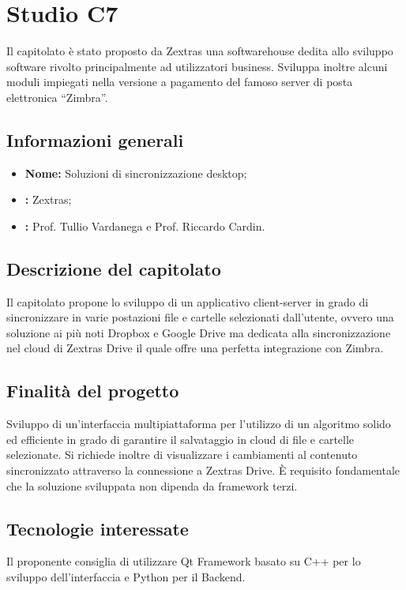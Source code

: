 \section{Studio C7}

Il capitolato è stato proposto da Zextras una softwarehouse dedita allo sviluppo software rivolto principalmente ad utilizzatori business.
Sviluppa inoltre alcuni moduli impiegati nella versione a pagamento del famoso server di posta elettronica “Zimbra”.

\subsection{Informazioni generali}
\begin{itemize}
	\item \textbf{Nome:} Soluzioni di sincronizzazione desktop;
	\item \textbf{:} Zextras;
	\item \textbf{:} Prof. Tullio Vardanega e Prof. Riccardo Cardin.
\end{itemize}

\subsection{Descrizione del capitolato}
Il capitolato propone lo sviluppo di un applicativo client-server in grado di sincronizzare in varie postazioni file e cartelle selezionati dall’utente, ovvero una soluzione ai più noti Dropbox e Google Drive ma dedicata alla sincronizzazione nel cloud di Zextras Drive il quale offre una perfetta integrazione con Zimbra.

\subsection{Finalità del progetto}
Sviluppo di un’interfaccia multipiattaforma per l’utilizzo di un algoritmo solido ed efficiente in grado di garantire il salvataggio in cloud di file e cartelle selezionate.
Si richiede inoltre di visualizzare i cambiamenti al contenuto sincronizzato attraverso la connessione a Zextras Drive. È requisito fondamentale che la soluzione sviluppata non dipenda da framework terzi.


\subsection{Tecnologie interessate}
Il proponente consiglia di utilizzare Qt Framework basato su C++ per lo sviluppo dell’interfaccia e Python per il Backend.

